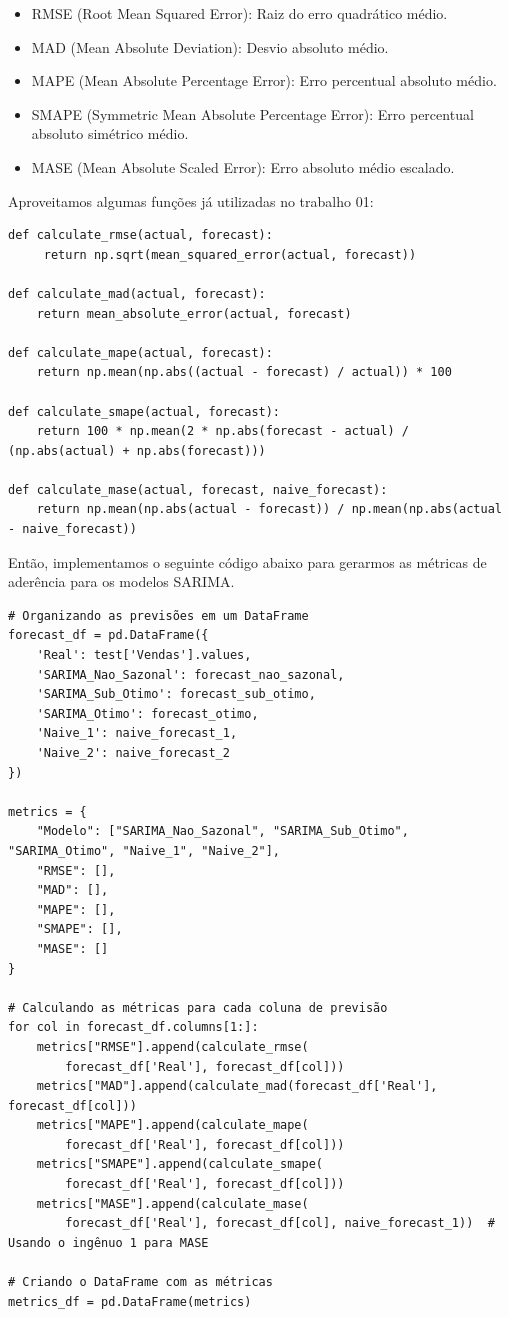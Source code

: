 \documentclass[a4paper, 12pt]{article}
\begin{document}
\begin{itemize}
    \item RMSE (Root Mean Squared Error): Raiz do erro quadrático médio.
    \item MAD (Mean Absolute Deviation): Desvio absoluto médio.
    \item MAPE (Mean Absolute Percentage Error): Erro percentual absoluto médio.
    \item SMAPE (Symmetric Mean Absolute Percentage Error): Erro percentual absoluto simétrico médio.
    \item MASE (Mean Absolute Scaled Error): Erro absoluto médio escalado.
\end{itemize}

Aproveitamos algumas funções já utilizadas no trabalho 01:

\begin{lstlisting}[style=python]
def calculate_rmse(actual, forecast):
     return np.sqrt(mean_squared_error(actual, forecast))

def calculate_mad(actual, forecast):
    return mean_absolute_error(actual, forecast)

def calculate_mape(actual, forecast):
    return np.mean(np.abs((actual - forecast) / actual)) * 100

def calculate_smape(actual, forecast):
    return 100 * np.mean(2 * np.abs(forecast - actual) / (np.abs(actual) + np.abs(forecast)))

def calculate_mase(actual, forecast, naive_forecast):
    return np.mean(np.abs(actual - forecast)) / np.mean(np.abs(actual - naive_forecast))
\end{lstlisting}

Então, implementamos o seguinte código abaixo para gerarmos as métricas de aderência para os modelos SARIMA.

\begin{lstlisting}[style=python]
# Organizando as previsões em um DataFrame
forecast_df = pd.DataFrame({
    'Real': test['Vendas'].values,
    'SARIMA_Nao_Sazonal': forecast_nao_sazonal,
    'SARIMA_Sub_Otimo': forecast_sub_otimo,
    'SARIMA_Otimo': forecast_otimo,
    'Naive_1': naive_forecast_1,
    'Naive_2': naive_forecast_2
})

metrics = {
    "Modelo": ["SARIMA_Nao_Sazonal", "SARIMA_Sub_Otimo", "SARIMA_Otimo", "Naive_1", "Naive_2"],
    "RMSE": [],
    "MAD": [],
    "MAPE": [],
    "SMAPE": [],
    "MASE": []
}

# Calculando as métricas para cada coluna de previsão
for col in forecast_df.columns[1:]:
    metrics["RMSE"].append(calculate_rmse(
        forecast_df['Real'], forecast_df[col]))
    metrics["MAD"].append(calculate_mad(forecast_df['Real'], forecast_df[col]))
    metrics["MAPE"].append(calculate_mape(
        forecast_df['Real'], forecast_df[col]))
    metrics["SMAPE"].append(calculate_smape(
        forecast_df['Real'], forecast_df[col]))
    metrics["MASE"].append(calculate_mase(
        forecast_df['Real'], forecast_df[col], naive_forecast_1))  # Usando o ingênuo 1 para MASE

# Criando o DataFrame com as métricas
metrics_df = pd.DataFrame(metrics)

\end{lstlisting}
\end{document}
